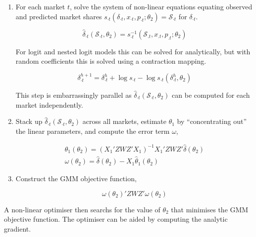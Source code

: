 \documentclass[parskip=half]{scrartcl}
\begin{document}
\begin{enumerate}
	
\item For each market \(t\), solve the system of non-linear equations equating observed and predicted market shares \(s_{\cdot t}(\delta_{\cdot t}, x_{\cdot t}, p_{\cdot t}; \theta_2) = \mathcal{S}_{\cdot t}\) for \(\delta_{\cdot t}\).	
	
\begin{equation}
\label{eq:market_inversion}
\hat\delta_{\cdot t}( \mathcal{S}_{\cdot t}, \theta_2) = s^{-1}_{\cdot t}(\mathcal{S}_{.t}, x_{.t}, p_{.t}; \theta_2)
\end{equation}

For logit and nested logit models this can be solved for analytically, but with random coefficients this is solved using a contraction mapping.

\begin{equation}
\label{eq:contraction}
\delta_{\cdot t}^{h+1} = \delta_{\cdot t}^h + \log s_{\cdot t} - \log s_{\cdot t}(\delta_{\cdot t}^h, \theta_2)
\end{equation}

This step is embarrassingly parallel as \(\hat\delta_{\cdot t}( \mathcal{S}_{\cdot t}, \theta_2)\) can be computed for each market independently.

\item Stack up \(\hat\delta_{\cdot t}( \mathcal{S}_{\cdot t}, \theta_2)\) across all markets, estimate \(\theta_1\) by ``concentrating out'' the linear parameters, and compute the error term \(\omega\),

\begin{gather}
\hat{\theta}_1(\theta_2) = (X_1'ZWZ'X_1)^{-1}X_1'ZWZ'\hat{\delta}(\theta_2) \\
\omega(\theta_2) = \hat{\delta}(\theta_2) - X_1 \hat{\theta}_1(\theta_2)
\end{gather}

\item Construct the GMM objective function,

\begin{equation}
\omega(\theta_2)' Z W Z' \omega(\theta_2)
\end{equation}
	
\end{enumerate}

A non-linear optimiser then searchs for the value of \(\theta_2\) that minimises the GMM objective function. The optimiser can be aided by computing the analytic gradient.
\end{document}
